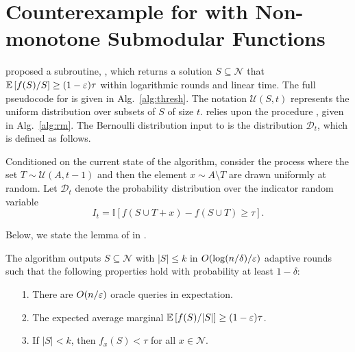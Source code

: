 \section{Counterexample for \thresam with Non-monotone Submodular Functions}
\label{sec:counterexample}
 proposed a subroutine, 
\thresam, which returns a solution
$S \subseteq \mathcal{N}$ that $\mathbb{E} \left[ f(S)/S \right] \ge (1-\varepsilon)\tau$
within logarithmic rounds and linear time. 
The full pseudocode for \thresam is given in Alg.~\ref{alg:thresh}.
The notation $\mathcal U ( S, t )$ represents the uniform distribution 
over subsets of $S$ of size $t$. 
\thresam relies upon the procedure \reducedmean, given in Alg.~\ref{alg:rm}.
The Bernoulli distribution input to \reducedmean is the distribution 
$\mathcal D_t$, which is defined as follows. 
\begin{definition} \label{def:indicator}
  Conditioned on the current state of the algorithm,
  consider the process where the set $T \sim \mathcal U (A, t - 1)$ and then
  the element $x \sim A \setminus T$ are drawn uniformly at random.
  Let $\mathcal D_t$ denote the probability distribution over the indicator
  random variable 
  $$I_t = \mathbb I [f( S \cup T  + x) - f( S \cup T ) \ge \tau ]. $$
\end{definition}

Below, we state the lemma of \thresam in .
\begin{lemma} \label{lemm:thresh} 
  The algorithm \thresam outputs $S \subseteq \mathcal N$ with
  $|S| \le k$ in $O( \log (n / \delta ) / \varepsilon )$ adaptive
  rounds such that the following properties hold with 
  probability at least $1 - \delta$: 
  \begin{itemize}
    \item[1.] There are $O( n / \varepsilon )$ oracle queries in expectation.
    \item[2.] The expected average marginal $\mathbb{E} \left[ f(S)/|S| \right] \ge (1-\varepsilon)\tau$.
    \item[3.]  If $|S| < k$, then $f_x(S) < \tau$ for all 
    $x \in \mathcal N$.
  \end{itemize}
\end{lemma}

